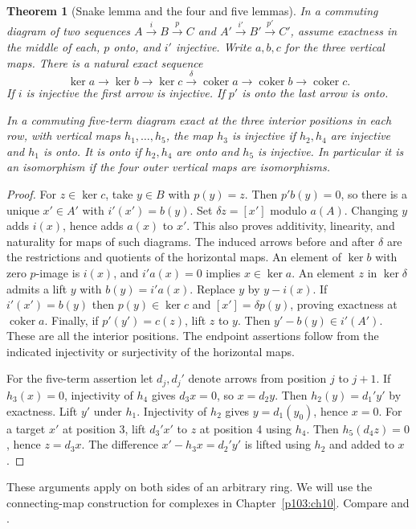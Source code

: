 \documentclass[11pt,oneside,openany]{book}
\newtheorem{theorem}{Theorem}[chapter]
\theoremstyle{definition}
\theoremstyle{remark}
\begin{document}
\begin{theorem}[Snake lemma and the four and five lemmas]
\label{p103:ALG-10-C01-R04}
In a commuting diagram of two sequences \(A\xrightarrow{i}B
\xrightarrow{p}C\) and \(A'\xrightarrow{i'}B'\xrightarrow{p'}C'\),
assume exactness in the middle of each, \(p\) onto, and \(i'\)
injective. Write \(a,b,c\) for the three vertical maps. There is a
natural exact sequence
\[
 \ker a\longrightarrow\ker b\longrightarrow\ker c
 \xrightarrow{\delta}\operatorname{coker}a
 \longrightarrow\operatorname{coker}b
 \longrightarrow\operatorname{coker}c.
\]
If \(i\) is injective the first arrow is injective. If \(p'\) is
onto the last arrow is onto.

In a commuting five-term diagram exact at the three interior
positions in each row, with vertical maps \(h_1,\ldots,h_5\), the
map \(h_3\) is injective if \(h_2,h_4\) are injective and \(h_1\)
is onto. It is onto if \(h_2,h_4\) are onto and \(h_5\) is
injective. In particular it is an isomorphism if the four outer
vertical maps are isomorphisms.
\end{theorem}
\begin{proof}
For \(z\in\ker c\), take \(y\in B\) with \(p(y)=z\). Then
\(p'b(y)=0\), so there is a unique \(x'\in A'\) with
\(i'(x')=b(y)\). Set \(\delta z=[x']\) modulo \(a(A)\).
Changing \(y\) adds \(i(x)\), hence adds \(a(x)\) to \(x'\).
This also proves additivity, linearity, and naturality for maps of
such diagrams. The induced arrows before and after \(\delta\)
are the restrictions and quotients of the horizontal maps.
An element of \(\ker b\) with zero \(p\)-image is \(i(x)\), and
\(i'a(x)=0\) implies \(x\in\ker a\). An element \(z\) in
\(\ker\delta\) admits a lift \(y\) with \(b(y)=i'a(x)\).
Replace \(y\) by \(y-i(x)\). If \(i'(x')=b(y)\) then
\(p(y)\in\ker c\) and \([x']=\delta p(y)\), proving exactness
at \(\operatorname{coker}a\). Finally, if \(p'(y')=c(z)\),
lift \(z\) to \(y\). Then \(y'-b(y)\in i'(A')\). These are all
the interior positions. The endpoint assertions follow from the
indicated injectivity or surjectivity of the horizontal maps.

For the five-term assertion let \(d_j,d_j'\) denote arrows from
position \(j\) to \(j+1\). If \(h_3(x)=0\), injectivity of \(h_4\)
gives \(d_3x=0\), so \(x=d_2y\). Then \(h_2(y)=d_1'y'\) by
exactness. Lift \(y'\) under \(h_1\). Injectivity of \(h_2\) gives
\(y=d_1(y_0)\), hence \(x=0\). For a target \(x'\) at position
3, lift \(d_3'x'\) to \(z\) at position 4 using \(h_4\).
Then \(h_5(d_4z)=0\), hence \(z=d_3 x\). The difference
\(x'-h_3x=d_2'y'\) is lifted using \(h_2\) and added to \(x\).
\end{proof}
These arguments apply on both sides of an arbitrary ring. We will
use the connecting-map construction for complexes in
Chapter~\ref{p103:ch10}. Compare \cite[Lemma 1.3.2]{weibel}
and \cite[Proposition 2.72]{rotman}.
\end{document}
